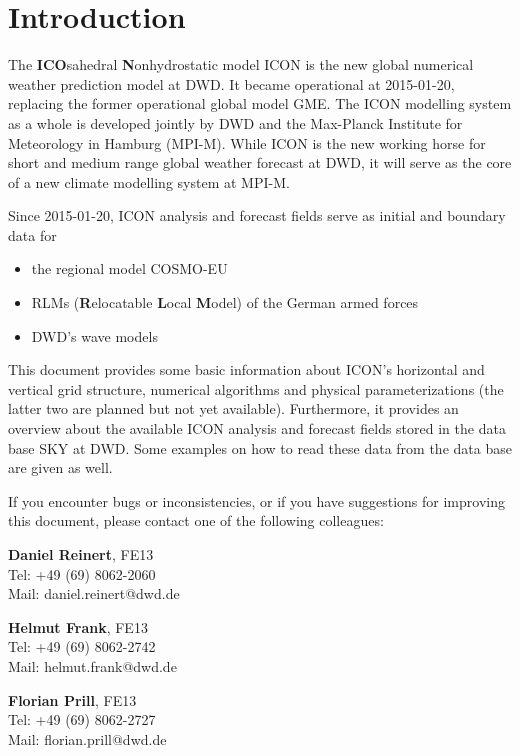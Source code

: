 \chapter{Introduction}

The \textbf{ICO}sahedral \textbf{N}onhydrostatic model ICON is the new global numerical 
weather prediction model at DWD. It became operational at 2015-01-20, replacing the former  
operational global model GME. The ICON modelling system as a whole is developed jointly by DWD and the 
Max-Planck Institute for Meteorology in Hamburg (MPI-M). While ICON is the new working horse 
for short and medium range global weather forecast at DWD, it will serve as the core of a new climate 
modelling system at MPI-M.

Since 2015-01-20, ICON analysis and forecast fields serve as initial and boundary data for
\begin{itemize}
 \item the regional model COSMO-EU
 \item RLMs (\textbf{R}elocatable \textbf{L}ocal \textbf{M}odel) of the German armed forces
 \item DWD's wave models
\end{itemize}

This document provides some basic information about ICON's horizontal and vertical grid structure, 
numerical algorithms and physical parameterizations (the latter two are planned but not yet available). 
Furthermore, it provides an overview about the available ICON analysis and forecast fields stored in the 
data base SKY at DWD. Some examples on how to read these data from the data base are given as well.

\vfill
If you encounter bugs or inconsistencies, or if you have suggestions for improving this document, 
please contact one of the following colleagues:

\begin{note}
\begin{minipage}{\textwidth}
\centering
\begin{minipage}{0.32\textwidth}
 \textbf{Daniel Reinert}, FE13 \\
 Tel: +49 (69) 8062-2060 \\ 
 Mail: daniel.reinert@dwd.de
\end{minipage}
\begin{minipage}{0.32\textwidth}
 \textbf{Helmut Frank}, FE13\\
 Tel: +49 (69) 8062-2742 \\ 
 Mail: helmut.frank@dwd.de
\end{minipage}
\begin{minipage}{0.32\textwidth}
 \textbf{Florian Prill}, FE13 \\
 Tel: +49 (69) 8062-2727 \\ 
 Mail: florian.prill@dwd.de
\end{minipage}
\end{minipage}
\end{note}  